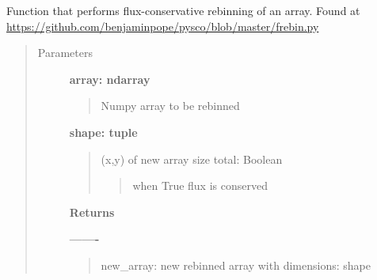 \documentclass[letterpaper,10pt,english]{sphinxmanual}
\begin{document}
\begin{fulllineitems}
\label{tools:tools.detutils.frebin}
Function that performs flux-conservative
rebinning of an array. Found at \url{https://github.com/benjaminpope/pysco/blob/master/frebin.py}
\begin{quote}\begin{description}
\item[{Parameters}] \leavevmode
\textbf{array: ndarray}
\begin{quote}

Numpy array to be rebinned
\end{quote}

\textbf{shape: tuple}
\begin{quote}

(x,y) of new array size
total: Boolean
\begin{quote}

when True flux is conserved
\end{quote}
\end{quote}

\textbf{Returns}

\textbf{-------}
\begin{quote}

new\_array: new rebinned array with dimensions: shape
\end{quote}

\end{description}\end{quote}

\end{fulllineitems}

\end{document}
